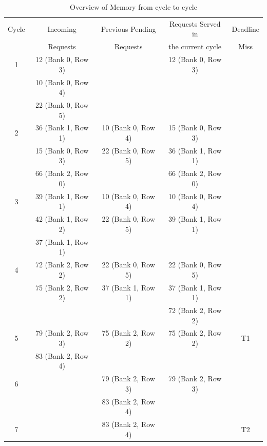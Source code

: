 \begin{table}[t]
 \begin{tabular}{|c|c|c|c|c|}\hline
 Cycle & Incoming & Previous Pending & Requests Served in & Deadline \\ 
       & Requests  & Requests         & the current cycle & Miss \\ \hline      
 1 & 12 (Bank 0, Row 3) & & 12 (Bank 0, Row 3) &  \\ 
   & 10 (Bank 0, Row 4) & & & \\ 
   & 22 (Bank 0, Row 5) & & & \\ \hline
 2 & 36 (Bank 1, Row 1) & 10 (Bank 0, Row 4) & 15 (Bank 0, Row 3) & \\ 
   & 15 (Bank 0, Row 3) & 22 (Bank 0, Row 5) & 36 (Bank 1, Row 1) & \\
   & 66 (Bank 2, Row 0) &                    & 66 (Bank 2, Row 0) & \\ \hline
 3 & 39 (Bank 1, Row 1) & 10 (Bank 0, Row 4) & 10 (Bank 0, Row 4) & \\
   & 42 (Bank 1, Row 2) & 22 (Bank 0, Row 5) & 39 (Bank 1, Row 1) & \\
   & 37 (Bank 1, Row 1) &                    &                    & \\ \hline
 4 & 72 (Bank 2, Row 2) & 22 (Bank 0, Row 5) & 22 (Bank 0, Row 5) & \\
   & 75 (Bank 2, Row 2) & 37 (Bank 1, Row 1) & 37 (Bank 1, Row 1) & \\ 
   &                    &                    & 72 (Bank 2, Row 2) & \\ \hline
 5 & 79 (Bank 2, Row 3) & 75 (Bank 2, Row 2) & 75 (Bank 2, Row 2) & T1\\ 
   & 83 (Bank 2, Row 4) &                    &                    & \\ \hline
 6 &                    & 79 (Bank 2, Row 3) & 79 (Bank 2, Row 3) &  \\ 
   &                    & 83 (Bank 2, Row 4) &                    &  \\ \hline
 7 &                    & 83 (Bank 2, Row 4) &                    & T2 \\ \hline
 \end{tabular}
\caption{Overview of Memory from cycle to cycle}
\label{tab9}
\end{table}

